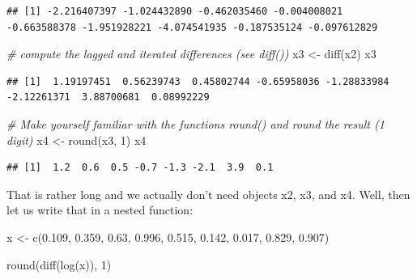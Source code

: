 \documentclass[
  12pt,
  oneside]{book}
\newenvironment{Shaded}{\begin{snugshade}}{\end{snugshade}}
\newcommand{\CommentTok}[1]{\textcolor[rgb]{0.56,0.35,0.01}{\textit{#1}}}
\newcommand{\DecValTok}[1]{\textcolor[rgb]{0.00,0.00,0.81}{#1}}
\newcommand{\FloatTok}[1]{\textcolor[rgb]{0.00,0.00,0.81}{#1}}
\newcommand{\FunctionTok}[1]{\textcolor[rgb]{0.00,0.00,0.00}{#1}}
\newcommand{\NormalTok}[1]{#1}
\newcommand{\OtherTok}[1]{\textcolor[rgb]{0.56,0.35,0.01}{#1}}
\theoremstyle{definition}
\theoremstyle{definition}
\theoremstyle{definition}
\theoremstyle{definition}
\theoremstyle{remark}
\begin{document}
\begin{verbatim}
## [1] -2.216407397 -1.024432890 -0.462035460 -0.004008021 -0.663588378 -1.951928221 -4.074541935 -0.187535124 -0.097612829
\end{verbatim}

\begin{Shaded}
\begin{Highlighting}[]
\CommentTok{\# compute the lagged and iterated differences (see \textasciigrave{}diff()\textasciigrave{})}
\NormalTok{x3 }\OtherTok{\textless{}{-}} \FunctionTok{diff}\NormalTok{(x2)}
\NormalTok{x3}
\end{Highlighting}
\end{Shaded}

\begin{verbatim}
## [1]  1.19197451  0.56239743  0.45802744 -0.65958036 -1.28833984 -2.12261371  3.88700681  0.08992229
\end{verbatim}

\begin{Shaded}
\begin{Highlighting}[]
\CommentTok{\#  Make yourself familiar with the functions round() and round the result (1 digit)}
\NormalTok{x4 }\OtherTok{\textless{}{-}} \FunctionTok{round}\NormalTok{(x3, }\DecValTok{1}\NormalTok{)}
\NormalTok{x4}
\end{Highlighting}
\end{Shaded}

\begin{verbatim}
## [1]  1.2  0.6  0.5 -0.7 -1.3 -2.1  3.9  0.1
\end{verbatim}

That is rather long and we actually don't need objects x2, x3, and x4. Well, then let us write that in a nested function:

\begin{Shaded}
\begin{Highlighting}[]
\NormalTok{x }\OtherTok{\textless{}{-}} \FunctionTok{c}\NormalTok{(}\FloatTok{0.109}\NormalTok{, }\FloatTok{0.359}\NormalTok{, }\FloatTok{0.63}\NormalTok{, }\FloatTok{0.996}\NormalTok{, }\FloatTok{0.515}\NormalTok{, }\FloatTok{0.142}\NormalTok{, }\FloatTok{0.017}\NormalTok{, }\FloatTok{0.829}\NormalTok{, }\FloatTok{0.907}\NormalTok{)}

\FunctionTok{round}\NormalTok{(}\FunctionTok{diff}\NormalTok{(}\FunctionTok{log}\NormalTok{(x)), }\DecValTok{1}\NormalTok{)}
\end{Highlighting}
\end{Shaded}
\end{document}
